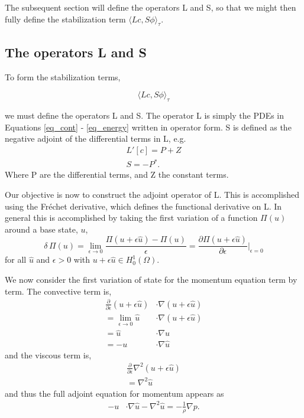 \documentclass{article}
\begin{document}
The subsequent section will define the operators L and S, so that we
might then fully define the stabilization term $\langle Lc,S\phi
\rangle_\tau$. 

%
%
\newpage
\subsection{The operators L and S}


To form the stabilization terms, 

\begin{equation}
 \langle Lc,S\phi \rangle_\tau
\end{equation}

we must define the operators L and S. The operator L is simply the PDEs
in Equations \ref{eq_cont} - \ref{eq_energy} written in operator form. S is
defined as the negative adjoint of the differential terms in L, e.g.
\begin{align}
 L'[c] = P + Z \\
 S = -P^*. 
\end{align}
Where P are the differential terms, and Z the constant terms. 

Our objective is now to construct the adjoint operator of L. This is
accomplished using the Fr\'echet derivative, which defines the
functional derivative on L. In general this is accomplished by taking
the first variation of a function $\Pi(u)$ around a base state, $u$,
\begin{equation}
 \delta\, \Pi(u) = \lim_{\epsilon \to 0} \frac{\Pi(u+\epsilon \hat u) -
  \Pi(u)}{\epsilon} =
  \frac{\partial \Pi(u +\epsilon \hat u)}{\partial \epsilon}
  \bigg|_{\epsilon = 0}
\end{equation}
for all $\hat u$ and $\epsilon > 0$ with $u + \epsilon \hat u \in
H^1_0(\Omega)$.

We now consider the first variation of state for the momentum equation
term by term. The convective term is, 
\begin{align}
 \frac{\partial}{\partial \epsilon} (u + \epsilon \hat u) &\cdot \nabla
  (u + \epsilon \hat u) \\
 = \lim_{\epsilon \to 0} \hat u &\cdot \nabla (u + \epsilon \hat u) \\
 = \hat u & \cdot \nabla u \\
 = - u &\cdot \nabla \hat u
\end{align}
and the viscous term is, 
\begin{align}
 \frac{\partial}{\partial \epsilon} \nabla^2 (u + \epsilon \hat u) \\
 = \nabla^2 \hat u
\end{align}
and thus the full adjoint equation for momentum appears as
\begin{align}
 - u &\cdot \nabla \hat u - \nabla^2 \hat u = -\frac{1}{\rho} \nabla p. 
\label{eq_adjmom}
\end{align}
\end{document}
